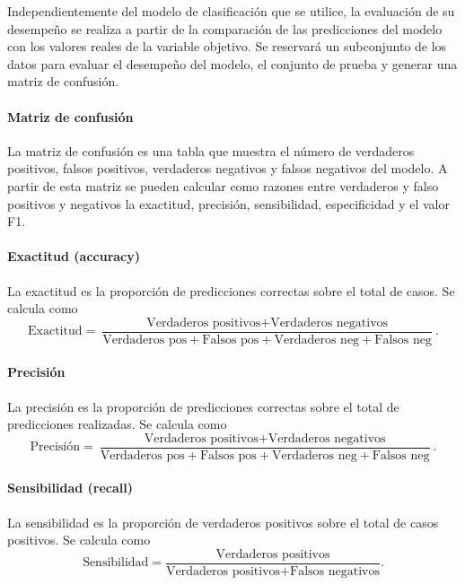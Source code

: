 \documentclass[a4paper]{report}
\begin{document}
Independientemente del modelo de clasificación que se utilice, la evaluación de su desempeño se realiza a partir de la comparación de las predicciones del modelo con los valores reales de la variable objetivo.
Se reservará un subconjunto de los datos para evaluar el desempeño del modelo, el conjunto de prueba y generar una matriz de confusión.

\paragraph{Matriz de confusión}
La matriz de confusión es una tabla que muestra el número de verdaderos positivos, falsos positivos, verdaderos negativos y falsos negativos del modelo.
A partir de esta matriz se pueden calcular como razones entre verdaderos y falso positivos y negativos la exactitud, precisión, sensibilidad, especificidad y el valor F1.

\paragraph{Exactitud (accuracy)}
La exactitud es la proporción de predicciones correctas sobre el total de casos.
Se calcula como
\begin{equation}
	\text{Exactitud} = \frac{\text{Verdaderos positivos} + \text{Verdaderos negativos}}{\text{Verdaderos pos} + \text{Falsos pos} + \text{Verdaderos neg} + \text{Falsos neg}}.
\end{equation}

\paragraph{Precisión}
La precisión es la proporción de predicciones correctas sobre el total de predicciones realizadas.
Se calcula como
\begin{equation}
	\text{Precisión} = \frac{\text{Verdaderos positivos} + \text{Verdaderos negativos}}{\text{Verdaderos pos} + \text{Falsos pos} + \text{Verdaderos neg} + \text{Falsos neg}}.
\end{equation}

\paragraph{Sensibilidad (recall)}
La sensibilidad es la proporción de verdaderos positivos sobre el total de casos positivos.
Se calcula como
\begin{equation}
	\text{Sensibilidad} = \frac{\text{Verdaderos positivos}}{\text{Verdaderos positivos} + \text{Falsos negativos}}.
\end{equation}
\end{document}
